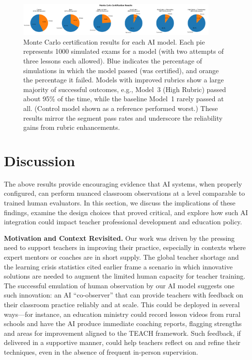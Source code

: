 \documentclass[12pt]{article}
\begin{document}
\begin{figure}[t]\centering
\includegraphics[width=0.9\textwidth]{monte_carlo_pie_charts.png}
\caption{Monte Carlo certification results for each AI model. Each pie represents 1000 simulated exams for a model (with two attempts of three lessons each allowed). Blue indicates the percentage of simulations in which the model passed (was certified), and orange the percentage it failed. Models with improved rubrics show a large majority of successful outcomes, e.g., Model~3 (High Rubric) passed about 95\% of the time, while the baseline Model~1 rarely passed at all. (Control model shown as a reference performed worst.) These results mirror the segment pass rates and underscore the reliability gains from rubric enhancements.}
\label{fig:monte-carlo-pie}
\end{figure}

\section{Discussion}
\label{sec:discussion}
\noindent The above results provide encouraging evidence that AI systems, when properly configured, can perform nuanced classroom observations at a level comparable to trained human evaluators. In this section, we discuss the implications of these findings, examine the design choices that proved critical, and explore how such AI integration could impact teacher professional development and education policy.

\textbf{Motivation and Context Revisited.} Our work was driven by the pressing need to support teachers in improving their practice, especially in contexts where expert mentors or coaches are in short supply. The global teacher shortage and the learning crisis statistics cited earlier frame a scenario in which innovative solutions are needed to augment the limited human capacity for teacher training. The successful emulation of human observation by our AI model suggests one such innovation: an AI “co-observer” that can provide teachers with feedback on their classroom practice reliably and at scale. This could be deployed in several ways—for instance, an education ministry could record lesson videos from rural schools and have the AI produce immediate coaching reports, flagging strengths and areas for improvement aligned to the TEACH framework. Such feedback, if delivered in a supportive manner, could help teachers reflect on and refine their techniques, even in the absence of frequent in-person supervision.
\end{document}
